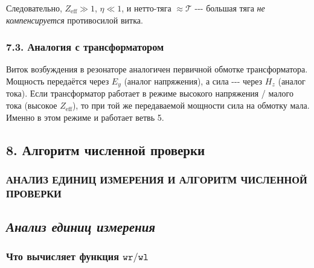 \documentclass[11pt]{article}
\begin{document}
Следовательно, \(Z_{\mathrm{eff}} \gg 1\), \(\eta \ll 1\), и нетто-тяга
\(\approx \mathcal{T}\) -\/-\/- большая тяга \emph{не компенсируется}
противосилой витка.

\subsubsection{7.3. Аналогия с
трансформатором}\label{ux430ux43dux430ux43bux43eux433ux438ux44f-ux441-ux442ux440ux430ux43dux441ux444ux43eux440ux43cux430ux442ux43eux440ux43eux43c}

Виток возбуждения в резонаторе аналогичен первичной обмотке
трансформатора. Мощность передаётся через \(E_y\) (аналог напряжения), а
сила -\/-\/- через \(H_z\) (аналог тока). Если трансформатор работает в
режиме высокого напряжения / малого тока (высокое \(Z_{\mathrm{eff}}\)),
то при той же передаваемой мощности сила на обмотку мала. Именно в этом
режиме и работает ветвь 5.

    \subsection{8. Алгоритм численной
проверки}\label{ux430ux43bux433ux43eux440ux438ux442ux43c-ux447ux438ux441ux43bux435ux43dux43dux43eux439-ux43fux440ux43eux432ux435ux440ux43aux438}

\subsubsection{АНАЛИЗ ЕДИНИЦ ИЗМЕРЕНИЯ И АЛГОРИТМ ЧИСЛЕННОЙ
ПРОВЕРКИ}\label{ux430ux43dux430ux43bux438ux437-ux435ux434ux438ux43dux438ux446-ux438ux437ux43cux435ux440ux435ux43dux438ux44f-ux438-ux430ux43bux433ux43eux440ux438ux442ux43c-ux447ux438ux441ux43bux435ux43dux43dux43eux439-ux43fux440ux43eux432ux435ux440ux43aux438}

\subsection{\texorpdfstring{\emph{Анализ единиц
измерения}}{Анализ единиц измерения}}\label{ux430ux43dux430ux43bux438ux437-ux435ux434ux438ux43dux438ux446-ux438ux437ux43cux435ux440ux435ux43dux438ux44f}

\subsubsection{\texorpdfstring{Что вычисляет функция
\(\texttt{wr}/\texttt{wl}\)}{Что вычисляет функция \textbackslash{}texttt\{wr\}/\textbackslash{}texttt\{wl\}}}\label{ux447ux442ux43e-ux432ux44bux447ux438ux441ux43bux44fux435ux442-ux444ux443ux43dux43aux446ux438ux44f-textttwrtextttwl}
\end{document}
